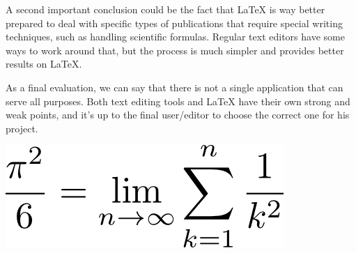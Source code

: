 A second important conclusion could be the fact that LaTeX is way better prepared to deal with specific types of publications that require special writing techniques, such as handling scientific formulas. Regular text editors have some ways to work around that, but the process is much simpler and provides better results on LaTeX.

As a final evaluation, we can say that there is not a single application that can serve all purposes. Both text editing tools and LaTeX have their own strong and weak points, and it's up to the final user/editor to choose the correct one for his project.

\includegraphics[scale=0.5]{Chapters/LatexFormulaEffect.png}
